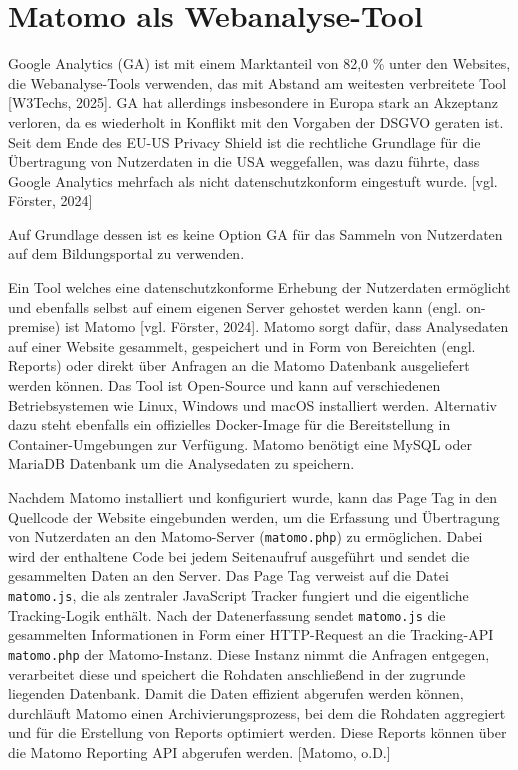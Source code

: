 \section{Matomo als Webanalyse-Tool}
Google Analytics (GA) ist mit einem Marktanteil von 82,0 \% unter den Websites, die Webanalyse-Tools verwenden, das mit Abstand am weitesten verbreitete Tool [W3Techs, 2025]. GA hat allerdings insbesondere in Europa stark an Akzeptanz verloren, da es wiederholt in Konflikt mit den Vorgaben der DSGVO geraten ist. Seit dem Ende des EU-US Privacy Shield ist die rechtliche Grundlage für die Übertragung von Nutzerdaten in die USA weggefallen, was dazu führte, dass Google Analytics mehrfach als nicht datenschutzkonform eingestuft wurde. [vgl. Förster, 2024]

Auf Grundlage dessen ist es keine Option GA für das Sammeln von Nutzerdaten auf dem Bildungsportal zu verwenden. 

Ein Tool welches eine datenschutzkonforme Erhebung der Nutzerdaten ermöglicht und ebenfalls selbst auf einem eigenen Server gehostet werden kann (engl. on-premise) ist Matomo [vgl. Förster, 2024]. Matomo sorgt dafür, dass Analysedaten auf einer Website gesammelt, gespeichert und in Form von Bereichten (engl. Reports) oder direkt über Anfragen an die Matomo Datenbank ausgeliefert werden können.
Das Tool ist Open-Source und kann auf verschiedenen Betriebsystemen wie Linux, Windows und macOS installiert werden. Alternativ dazu steht ebenfalls ein offizielles Docker-Image für die Bereitstellung in Container-Umgebungen zur Verfügung. Matomo benötigt eine MySQL oder MariaDB Datenbank um die Analysedaten zu speichern. 

Nachdem Matomo installiert und konfiguriert wurde, kann das Page Tag in den Quellcode der Website eingebunden werden, um die Erfassung und Übertragung von Nutzerdaten an den Matomo-Server (\texttt{matomo.php}) zu ermöglichen. Dabei wird der enthaltene Code bei jedem Seitenaufruf ausgeführt und sendet die gesammelten Daten an den Server. Das Page Tag verweist auf die Datei \texttt{matomo.js}, die als zentraler JavaScript Tracker fungiert und die eigentliche Tracking-Logik enthält. Nach der Datenerfassung sendet \texttt{matomo.js} die gesammelten Informationen in Form einer HTTP-Request an die Tracking-API \texttt{matomo.php} der Matomo-Instanz. Diese Instanz nimmt die Anfragen entgegen, verarbeitet diese und speichert die Rohdaten anschließend in der zugrunde liegenden Datenbank. Damit die Daten effizient abgerufen werden können, durchläuft Matomo einen Archivierungsprozess, bei dem die Rohdaten aggregiert und für die Erstellung von Reports optimiert werden. Diese Reports können über die Matomo Reporting API abgerufen werden. [Matomo, o.D.]

